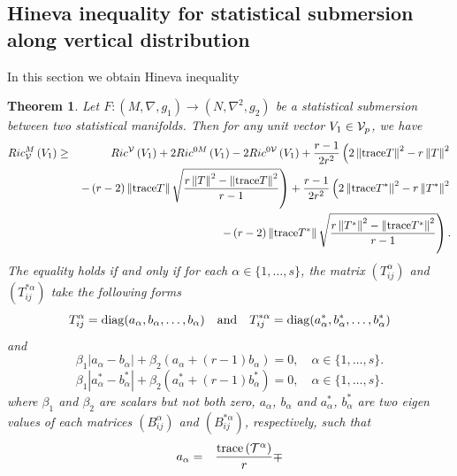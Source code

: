 \documentclass[10pt,a4paper]{article}
\newtheorem{theorem}{Theorem}[section]
\theoremstyle{definition}
\theoremstyle{remark}
\numberwithin{equation}{section}
\begin{document}
\subsection{Hineva inequality for statistical submersion along vertical distribution}

In this section we obtain Hineva inequality

\begin{theorem}
\label{Theorem-Hineva-vert}Let $F:\left( M,\nabla ,g_{1}\right) \rightarrow
\left( N,\nabla ^{2},g_{2}\right) $ be a statistical submersion between two
statistical manifolds. Then for any unit vector $V_{1}\in {\cal V}_{p}$, we
have%
\begin{eqnarray*}
Ric_{{\cal V}}^{M}\left( V_{1}\right) &\geq &Ric^{{\cal V}}\left(
V_{1}\right) +2Ric^{0M}\left( V_{1}\right) -2Ric^{0{\cal V}}\left(
V_{1}\right) +\frac{r-1}{2r^{2}}\left( 2\left\Vert {\rm trace}T\right\Vert
^{2}-r\left\Vert T\right\Vert ^{2}\right. \\
&&\left. -\left( r-2\right) \left\Vert {\rm trace}T\right\Vert \sqrt{\frac{%
r\left\Vert T\right\Vert ^{2}-\left\Vert {\rm trace}T\right\Vert ^{2}}{r-1}}%
\right) +\frac{r-1}{2r^{2}}\left( 2\left\Vert {\rm trace}T^{\ast
}\right\Vert ^{2}-r\left\Vert T^{\ast }\right\Vert ^{2}\right. \\
&&\left. -\left( r-2\right) \left\Vert {\rm trace}T^{\ast }\right\Vert \sqrt{%
\frac{r\left\Vert T^{\ast }\right\Vert ^{2}-\left\Vert {\rm trace}T^{\ast
}\right\Vert ^{2}}{r-1}}\right) .
\end{eqnarray*}%
The equality holds if and only if for each $\alpha \in \{1,\ldots ,s\}$, the
matrix $(T_{ij}^{\alpha })$ and $(T_{ij}^{\ast \alpha })$ take the following
forms 
\[
T_{ij}^{\alpha }={\rm diag}(a_{\alpha },b_{\alpha },\ldots ,b_{\alpha
})\quad {\rm and\quad }T_{ij}^{\ast \alpha }={\rm diag}(a_{\alpha }^{\ast
},b_{\alpha }^{\ast },\ldots ,b_{\alpha }^{\ast }) 
\]%
and%
\[
\beta _{1}|a_{\alpha }-b_{\alpha }|+\beta _{2}\left( a_{\alpha
}+(r-1)b_{\alpha }\right) =0,\quad \alpha \in \{1,\ldots ,s\}. 
\]%
\[
\beta _{1}|a_{\alpha }^{\ast }-b_{\alpha }^{\ast }|+\beta _{2}\left(
a_{\alpha }^{\ast }+(r-1)b_{\alpha }^{\ast }\right) =0,\quad \alpha \in
\{1,\ldots ,s\}. 
\]%
where $\beta _{1}$ and $\beta _{2}$ are scalars but not both zero, $%
a_{\alpha }$, $b_{\alpha }$ and $a_{\alpha }^{\ast }$, $b_{\alpha }^{\ast }$
are two eigen values of each matrices $(B_{ij}^{\alpha })$ and $%
(B_{ij}^{\ast \alpha })$, respectively, such that%
\begin{eqnarray*}
a_{\alpha } &=&\frac{{\rm trace}\left( {\cal T}^{\alpha }\right) }{r}\mp 

\end{eqnarray*}
\end{theorem}
\end{document}
